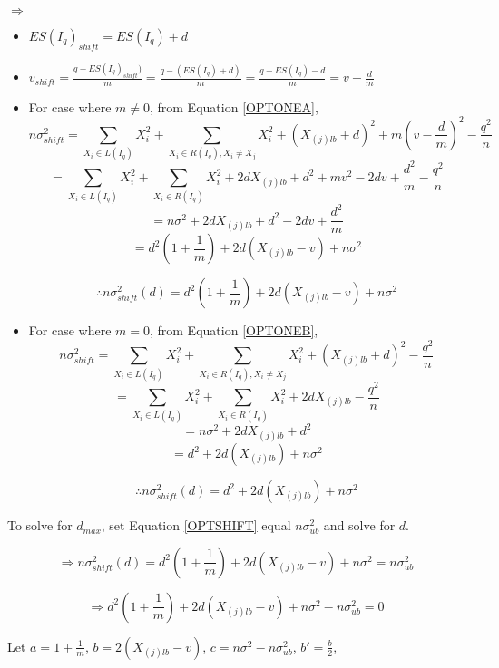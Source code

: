 \documentclass[a4paper,12pt]{article}
\begin{document}
$\Rightarrow$
\begin{itemize}

\item $ES(I_{q})_{shift} = ES(I_{q}) + d$

\item $v_{shift} = \frac{q-ES(I_{q})_{shift})}{m} = \frac{q-(ES(I_{q}) + d)}{m} = \frac{q - ES(I_{q}) - d}{m} = v-\frac{d}{m}$

\item For case where $m \neq 0$, from Equation \ref{OPTONEA},
$$
n\sigma^2_{shift}  = \sum_{X_{i} \in L(I_{q})}X_{i}^2 + \sum_{X_{i} \in R(I_{q}), X_{i}\neq X_{j}}X_{i}^2 + (X_{(j)lb} + d)^2 + m(v-\frac{d}{m})^2 - \frac{q^2}{n}
$$ 
$$
= \sum_{X_{i} \in L(I_{q})}X_{i}^2 + \sum_{X_{i} \in R(I_{q})}X_{i}^2 + 2dX_{(j)lb} + d^2 + mv^2 -2dv + \frac{d^2}{m} - \frac{q^2}{n}
$$
$$
= n\sigma^2 + 2dX_{(j)lb} + d^2 -2dv + \frac{d^2}{m}
$$
$$
= d^2(1+\frac{1}{m}) + 2d(X_{(j)lb}-v) + n\sigma^2
$$

\begin{equation}
\label{OPTSHIFT}
\therefore n\sigma^2_{shift}(d)= d^2(1+\frac{1}{m}) + 2d(X_{(j)lb}-v) + n\sigma^2
\end{equation}

\item For case where $m = 0$, from Equation \ref{OPTONEB},
$$
n\sigma^2_{shift}  = \sum_{X_{i} \in L(I_{q})}X_{i}^2 + \sum_{X_{i} \in R(I_{q}), X_{i}\neq X_{j}}X_{i}^2 + (X_{(j)lb} + d)^2 - \frac{q^2}{n}
$$ 
$$
= \sum_{X_{i} \in L(I_{q})}X_{i}^2 + \sum_{X_{i} \in R(I_{q})}X_{i}^2 + 2dX_{(j)lb} - \frac{q^2}{n}
$$
$$
= n\sigma^2 + 2dX_{(j)lb} + d^2 
$$
$$
= d^2 + 2d(X_{(j)lb}) + n\sigma^2
$$

\begin{equation}
\label{OPTSHIFTB}
\therefore n\sigma^2_{shift}(d) = d^2 + 2d(X_{(j)lb}) + n\sigma^2
\end{equation}

\end{itemize}

To solve for $d_{max}$, set Equation \ref{OPTSHIFT} equal $n \sigma_{ub}^2$ and solve for $d$. 

$$
\Rightarrow n\sigma^2_{shift}(d)= d^2(1+\frac{1}{m}) + 2d(X_{(j)lb}-v) + n\sigma^2 = n \sigma_{ub}^2
$$

$$
\Rightarrow d^2(1+\frac{1}{m}) + 2d(X_{(j)lb}-v) + n\sigma^2 - n \sigma_{ub}^2 = 0
$$

Let $a = 1+\frac{1}{m}$, $b=2(X_{(j)lb}-v)$, $c=n\sigma^2 - n \sigma_{ub}^2$, $b'=\frac{b}{2}$, 
\end{document}
